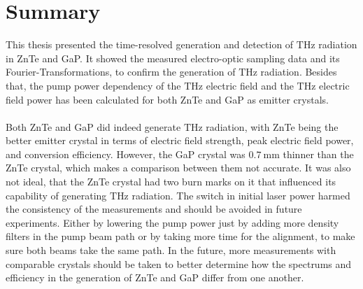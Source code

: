 \chapter{Summary}
This thesis presented the time-resolved generation and detection of $\si{\tera\hertz}$ radiation in ZnTe and GaP.
It showed the measured electro-optic sampling data and its Fourier-Transformations, to confirm the generation of $\si{\tera\hertz}$ radiation.
Besides that, the pump power dependency of the $\si{\tera\hertz}$ electric field and the $\si{\tera\hertz}$ electric field power has been calculated for both ZnTe and GaP as emitter crystals.
\\\\
Both ZnTe and GaP did indeed generate $\si{\tera\hertz}$ radiation, with ZnTe being the better emitter crystal in terms of electric field strength, peak electric field power, and conversion efficiency.
However, the GaP crystal was $\SI{0.7}{\milli\meter}$ thinner than the ZnTe crystal, which makes a comparison between them not accurate.
It was also not ideal, that the ZnTe crystal had two burn marks on it that influenced its capability of generating $\si{\tera\hertz}$ radiation.
The switch in initial laser power harmed the consistency of the measurements and should be avoided in future experiments.
Either by lowering the pump power just by adding more density filters in the pump beam path or by taking more time for the alignment, to make sure both beams take the same path.
In the future, more measurements with comparable crystals should be taken to better determine how the spectrums and efficiency in the generation of ZnTe and GaP differ from one another.
